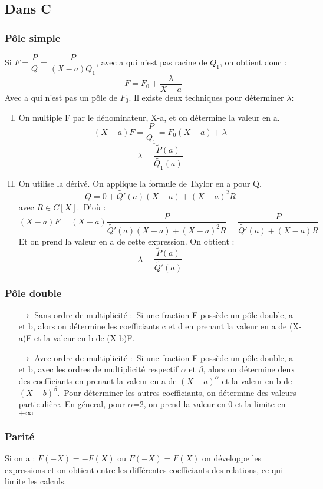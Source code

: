 \documentclass[a4paper,12 pt,oneside]{report}     %
\begin{document}
\subsection{Dans C}
\subsubsection{Pôle simple}
Si $F = \dfrac{P}{Q} = \dfrac{P}{(X-a)Q_1}$, avec a qui n'est pas racine de $Q_1$, on obtient donc : 
$$F = F_0 + \dfrac{\lambda}{X-a}$$
Avec a qui n'est pas un pôle de $F_0$. Il existe deux techniques pour déterminer $\lambda$: 
\begin{enumerate}[I) ]
 \item On multiple F par le dénominateur, X-a, et on détermine la valeur en a. $$(X-a)F= \dfrac{P}{Q_1}=F_0(X-a) + \lambda$$
$$\lambda = \dfrac{\tilde{P}(a)}{\tilde{Q_1}(a)}$$
 \item On utilise la dérivé. On applique la formule de Taylor en a pour Q. 
$$Q = 0 + \tilde{Q'}(a)(X-a) + (X-a)^2R$$
avec $R \in C[X]$.\
D'où :
$$(X-a)F = (X-a)\dfrac{P}{\tilde{Q'}(a)(X-a) + (X-a)^2R} = \dfrac{P}{\tilde{Q'}(a) + (X-a)R}$$
Et on prend la valeur en a de cette expression. On obtient : 
$$\lambda = \dfrac{\tilde{P}(a)}{\tilde{Q'}(a)}$$
\end{enumerate}
\subsubsection{Pôle double}
\begin{itemize}
 \item[$\rightarrow$]Sans ordre de multiplicité :\ Si une fraction F possède un pôle double, a et b, alors on détermine les coefficiants c et d en prenant la valeur en a de (X-a)F et la valeur en b de (X-b)F.
 \item[$\rightarrow$] Avec ordre de multiplicité :\ Si une fraction F possède un pôle double, a et b, avec les ordres de multiplicité respectif $\alpha$ et $\beta$, alors on détermine deux des coefficiants en prenant la valeur en a de $(X-a)^{\alpha}$ et la valeur en b de $(X-b)^{\beta}$.\
Pour déterminer les autres coefficiants, on détermine des valeurs particulière. En géneral, pour $\alpha$=2, on prend la valeur en 0 et la limite en $+\infty$
\end{itemize}
\subsubsection{Parité}
Si on a : $F(-X) = -F(X)$ ou $F(-X)=F(X)$ on développe les expressions et on obtient entre les différentes coefficiants des relations, ce qui limite les calculs.
\end{document}
